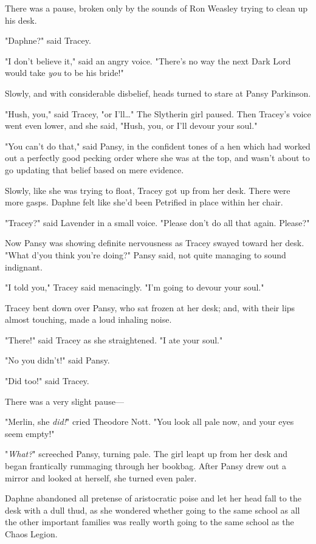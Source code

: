 There was a pause, broken only by the sounds of Ron Weasley trying to clean up 
his desk.

"Daphne?" said Tracey.

"I don't believe it," said an angry voice. "There's no way the next Dark Lord 
would take \emph{you} to be his bride!"

Slowly, and with considerable disbelief, heads turned to stare at Pansy 
Parkinson.

"Hush, you," said Tracey, "or I'll{\ldots}" The Slytherin girl paused. Then 
Tracey's voice went even lower, and she said, "Hush, you, or I'll devour your 
soul."

"You can't do that," said Pansy, in the confident tones of a hen which had 
worked out a perfectly good pecking order where she was at the top, and wasn't 
about to go updating that belief based on mere evidence.

Slowly, like she was trying to float, Tracey got up from her desk. There were 
more gasps. Daphne felt like she'd been Petrified in place within her chair.

"Tracey?" said Lavender in a small voice. "Please don't do all that again. 
Please?"

Now Pansy was showing definite nervousness as Tracey swayed toward her desk. 
"What d'you think you're doing?" Pansy said, not quite managing to sound 
indignant.

"I told you," Tracey said menacingly. "I'm going to devour your soul."

Tracey bent down over Pansy, who sat frozen at her desk; and, with their lips 
almost touching, made a loud inhaling noise.

"There!" said Tracey as she straightened. "I ate your soul."

"No you didn't!" said Pansy.

"Did too!" said Tracey.

There was a very slight pause---

"Merlin, she \emph{did!}" cried Theodore Nott. "You look all pale now, and your 
eyes seem empty!"

"\emph{What?}" screeched Pansy, turning pale. The girl leapt up from her desk 
and began frantically rummaging through her bookbag. After Pansy drew out a 
mirror and looked at herself, she turned even paler.

Daphne abandoned all pretense of aristocratic poise and let her head fall to 
the desk with a dull thud, as she wondered whether going to the same school as 
all the other important families was really worth going to the same school as 
the Chaos Legion.

